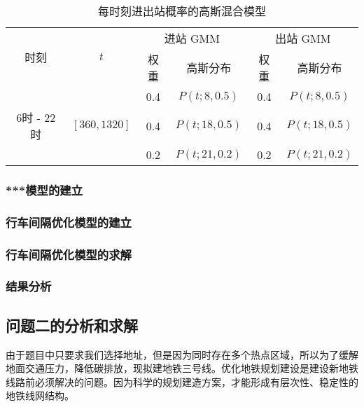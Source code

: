 \documentclass[12pt,a4paper]{mcmthesis}
\begin{document}
\begin{table}[h]
    \centering
    \caption{每时刻进出站概率的高斯混合模型}
    \label{tab:p1_gmm-time}
    \begin{tabular}{c|c|cc|cc}
        \hline
        \multirow{2}{*}{时刻} & \multirow{2}{*}{$t$} & \multicolumn{2}{c|}{进站 GMM} & \multicolumn{2}{c}{出站 GMM} \\ \cline{3-6}
                   &                        & 权重 & 高斯分布      & 权重 & 高斯分布      \\ \hline
                   &                        & 0.4 & $P(t;8,0.5)$ & 0.4 & $P(t;8,0.5)$ \\
        6时 - 22时 & $\left[360,1320\right]$ & 0.4 & $P(t;18,0.5)$ & 0.4 & $P(t;18,0.5)$ \\
                   &                        & 0.2 & $P(t;21,0.2)$ & 0.2 & $P(t;21,0.2)$ \\ \hline
    \end{tabular}
\end{table}


\subsubsection{***模型的建立}
\subsubsection{行车间隔优化模型的建立}

\subsubsection{行车间隔优化模型的求解}

\subsubsection{结果分析}

\subsection{问题二的分析和求解}
由于题目中只要求我们选择地址，但是因为同时存在多个热点区域，所以为了缓解地面交通压力，降低碳排放，现拟建地铁三号线。优化地铁规划建设是建设新地铁线路前必须解决的问题。因为科学的规划建造方案，才能形成有层次性、稳定性的地铁线网结构。
\end{document}
